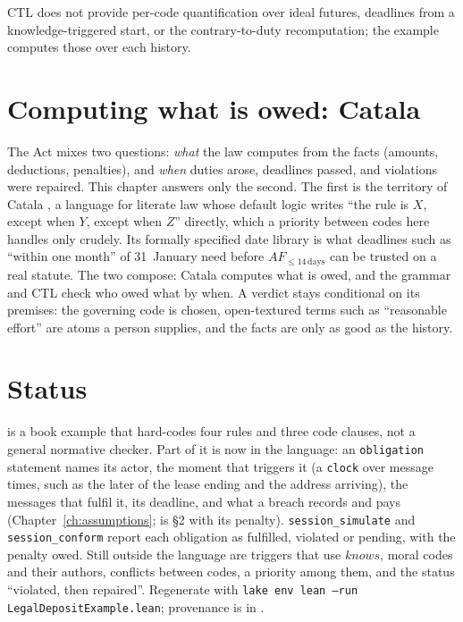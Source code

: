 CTL does not provide per-code quantification over ideal futures, deadlines from a
knowledge-triggered start, or the contrary-to-duty recomputation; the example
computes those over each history.

\section{Computing what is owed: Catala}

The Act mixes two questions: \emph{what} the law computes from the facts (amounts,
deductions, penalties), and \emph{when} duties arose, deadlines passed, and
violations were repaired. This chapter answers only the second. The first is the
territory of Catala \citep{merigoux2021catala}, a language for literate law whose
default logic writes ``the rule is $X$, except when $Y$, except when $Z$''
directly, which a priority between codes here handles only crudely. Its formally
specified date library is what deadlines such as ``within one month'' of
31~January need before $AF_{\le 14\,\mathrm{days}}$ can be trusted on a real
statute. The two compose: Catala computes what is owed, and the grammar and CTL
check who owed what by when. A verdict stays conditional on its premises: the
governing code is chosen, open-textured terms such as ``reasonable effort'' are
atoms a person supplies, and the facts are only as good as the history.

\section{Status}

 is a book example that hard-codes four rules and
three code clauses, not a general normative checker. Part of it is now in the
language: an \texttt{obligation} statement names its actor, the moment that
triggers it (a \texttt{clock} over message times, such as the later of the lease
ending and the address arriving), the messages that fulfil it, its deadline, and
what a breach records and pays (Chapter~\ref{ch:assumptions};
 is \S2 with its penalty).
\texttt{session\_simulate} and \texttt{session\_conform} report each obligation as
fulfilled, violated or pending, with the penalty owed. Still outside the language
are triggers that use $\mathit{knows}$, moral codes and their authors, conflicts
between codes, a priority among them, and the status ``violated, then repaired''.
Regenerate with \texttt{lake env lean --run LegalDepositExample.lean}; provenance
is in .
